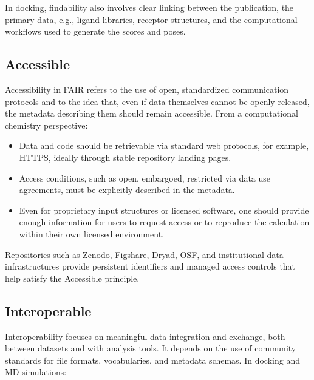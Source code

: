 \documentclass[12pt]{article}
\begin{document}
In docking, findability also involves clear linking between the publication, the primary data, e.g., ligand libraries, receptor structures, and the computational workflows used to generate the scores and poses.\cite{CH12_plos2025tenDocking,CH12_rigorRepro2020}

\subsection{Accessible}

Accessibility in FAIR refers to the use of open, standardized communication protocols and to the idea that, even if data themselves cannot be openly released, the metadata describing them should remain accessible.\cite{CH12_goFairPrinciples,CH12_nnlmFAIR} From a computational chemistry perspective:

\begin{itemize}
  \item Data and code should be retrievable via standard web protocols, for example, HTTPS, ideally through stable repository landing pages.
  \item Access conditions, such as open, embargoed, restricted via data use agreements, must be explicitly described in the metadata.
  \item Even for proprietary input structures or licensed software, one should provide enough information for users to request access or to reproduce the calculation within their own licensed environment.\cite{CH12_goFairPrinciples,CH12_nnlmFAIR,CH12_rigorRepro2020}
\end{itemize}

Repositories such as Zenodo, Figshare, Dryad, OSF, and institutional data infrastructures provide persistent identifiers and managed access controls that help satisfy the Accessible principle.\cite{CH12_uTexasRepos,CH12_aguRepos,CH12_snsfRepos}

\subsection{Interoperable}

Interoperability focuses on meaningful data integration and exchange, both between datasets and with analysis tools. It depends on the use of community standards for file formats, vocabularies, and metadata schemas.\cite{CH12_wilkinson2016FAIR,CH12_goFairPrinciples,CH12_helpingFAIR2019} In docking and MD simulations:
\end{document}
